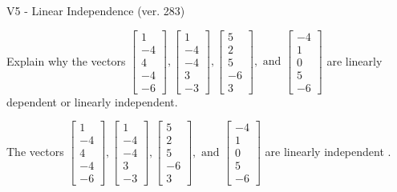 \begin{exercise}
  \begin{exerciseTitle}V5 - Linear Independence (ver. 283)\end{exerciseTitle}
  \begin{exerciseStatement}
    Explain why the vectors \(\left[\begin{array}{r}
1 \\
-4 \\
4 \\
-4 \\
-6
\end{array}\right] , \left[\begin{array}{r}
1 \\
-4 \\
-4 \\
3 \\
-3
\end{array}\right] , \left[\begin{array}{r}
5 \\
2 \\
5 \\
-6 \\
3
\end{array}\right] , \text{ and } \left[\begin{array}{r}
-4 \\
1 \\
0 \\
5 \\
-6
\end{array}\right]\) are linearly dependent or linearly independent.	


  \end{exerciseStatement}
  \begin{exerciseAnswer}
   The vectors \(\left[\begin{array}{r}
1 \\
-4 \\
4 \\
-4 \\
-6
\end{array}\right] , \left[\begin{array}{r}
1 \\
-4 \\
-4 \\
3 \\
-3
\end{array}\right] , \left[\begin{array}{r}
5 \\
2 \\
5 \\
-6 \\
3
\end{array}\right] , \text{ and } \left[\begin{array}{r}
-4 \\
1 \\
0 \\
5 \\
-6
\end{array}\right]\) are 
  	 linearly independent  .
  


  \end{exerciseAnswer}
\end{exercise}